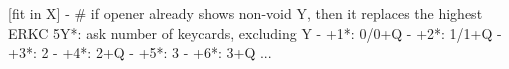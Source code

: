 [fit in X] - 
# if opener already shows non-void Y, then it replaces the highest ERKC
5Y*: ask number of keycards, excluding Y
   - +1*: 0/0+Q
   - +2*: 1/1+Q
   - +3*: 2
   - +4*: 2+Q
   - +5*: 3
   - +6*: 3+Q
   ...